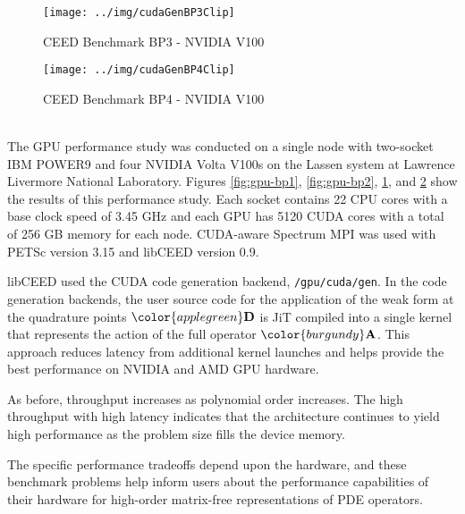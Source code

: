 \begin{figure}[ht!]
\texttt{[image: ../img/cudaGenBP3Clip]}
\caption{CEED Benchmark BP3 - NVIDIA V100}
\label{fig:gpu-bp3}
\end{figure}

\begin{figure}[ht!]
\texttt{[image: ../img/cudaGenBP4Clip]}
\caption{CEED Benchmark BP4 - NVIDIA V100}
\label{fig:gpu-bp4}
\end{figure}

~\\
The GPU performance study was conducted on a single node with two-socket IBM POWER9 and four NVIDIA Volta V100s on the Lassen system at Lawrence Livermore National Laboratory.
Figures \ref{fig:gpu-bp1}, \ref{fig:gpu-bp2}, \ref{fig:gpu-bp3}, and \ref{fig:gpu-bp4} show the results of this performance study.
Each socket contains 22 CPU cores with a base clock speed of 3.45 GHz and each GPU has 5120 CUDA cores with a total of 256 GB memory for each node.
CUDA-aware Spectrum MPI was used with PETSc \cite{petsc-user-ref} version 3.15 and libCEED \cite{libceed} version 0.9.

libCEED used the CUDA code generation backend, \lstinline{/gpu/cuda/gen}.
In the code generation backends, the user source code for the application of the weak form at the quadrature points ${\color{applegreen}\mathbf{D}}$ is JiT compiled into a single kernel that represents the action of the full operator ${\color{burgundy}\mathbf{A}}$.
This approach reduces latency from additional kernel launches and helps provide the best performance on NVIDIA and AMD GPU hardware.

As before, throughput increases as polynomial order increases.
The high throughput with high latency indicates that the architecture continues to yield high performance as the problem size fills the device memory.

The specific performance tradeoffs depend upon the hardware, and these benchmark problems help inform users about the performance capabilities of their hardware for high-order matrix-free representations of PDE operators.